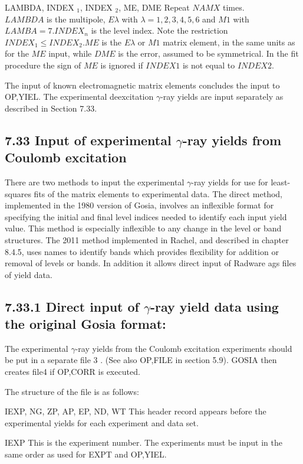 \documentclass[10pt]{article}
\begin{document}
LAMBDA, INDEX $_{1}$, INDEX $_{2}$, ME, DME Repeat $N A M X$ times.\\
$L A M B D A$ is the multipole, $E \lambda$ with $\lambda=1,2,3,4,5,6$ and $M 1$ with $L A M B A=7 . I N D E X_{n}$ is the level index. Note the restriction $I N D E X_{1} \leq I N D E X_{2} . M E$ is the $E \lambda$ or $M 1$ matrix element, in the same units as for the $M E$ input, while $D M E$ is the error, assumed to be symmetrical. In the fit procedure the sign of $M E$ is ignored if $I N D E X 1$ is not equal to $I N D E X 2$.

The input of known electromagnetic matrix elements concludes the input to OP,YIEL. The experimental deexcitation $\gamma$-ray yields are input separately as described in Section 7.33.

\subsection*{7.33 Input of experimental $\gamma$-ray yields from Coulomb excitation}
There are two methods to input the experimental $\gamma$-ray yields for use for least-squares fits of the matrix elements to experimental data. The direct method, implemented in the 1980 version of Gosia, involves an inflexible format for specifying the initial and final level indices needed to identify each input yield value. This method is especially inflexible to any change in the level or band structures. The 2011 method implemented in Rachel, and described in chapter 8.4.5, uses names to identify bands which provides flexibility for addition or removal of levels or bands. In addition it allows direct input of Radware ags files of yield data.

\subsection*{7.33.1 Direct input of $\gamma$-ray yield data using the original Gosia format:}
The experimental $\gamma$-ray yields from the Coulomb excitation experiments should be put in a separate file 3 . (See also OP,FILE in section 5.9). GOSIA then creates file4 if OP,CORR is executed.

The structure of the file is as follows:

IEXP, NG, ZP, AP, EP, ND, WT This header record appears before the experimental yields for each experiment and data set.

IEXP This is the experiment number. The experiments must be input in the same order as used for EXPT and OP,YIEL.
\end{document}
